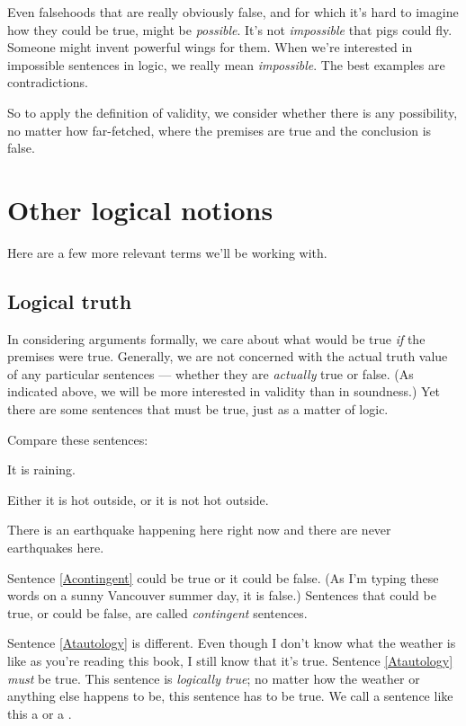 Even falsehoods that are really obviously false, and for which it's hard to imagine how they could be true, might be \emph{possible}. It's not \emph{impossible} that pigs could fly. Someone might invent powerful wings for them. When we're interested in impossible sentences in logic, we really mean \emph{impossible}. The best examples are contradictions.

So to apply the definition of validity, we consider whether there is any possibility, no matter how far-fetched, where the premises are true and the conclusion is false.

\section{Other logical notions}

Here are a few more relevant terms we'll be working with.

\subsection{Logical truth}
\label{sec-tautologydef}
In considering arguments formally, we care about what would be true \emph{if} the premises were true. Generally, we are not concerned with the actual truth value of any particular sentences --- whether they are \emph{actually} true or false. (As indicated above, we will be more interested in validity than in soundness.) Yet there are some sentences that must be true, just as a matter of logic.

Compare these sentences:
\begin{earg}
\item[\ex{Acontingent}] It is raining.
\item[\ex{Atautology}] Either it is hot outside, or it is not hot outside.
\item[\ex{Acontradiction}] There is an earthquake happening here right now and there are never earthquakes here.
\end{earg}
Sentence \ref{Acontingent} could be true or it could be false. (As I'm typing these words on a sunny Vancouver summer day, it is false.) Sentences that could be true, or could be false, are called \emph{contingent} sentences.

Sentence \ref{Atautology} is different. Even though I don't know what the weather is like as you're reading this book, I still know that it's true. Sentence \ref{Atautology} \emph{must} be true. This sentence is \emph{logically true}; no matter how the weather or anything else happens to be, this sentence has to be true. We call a sentence like this a  or a .

